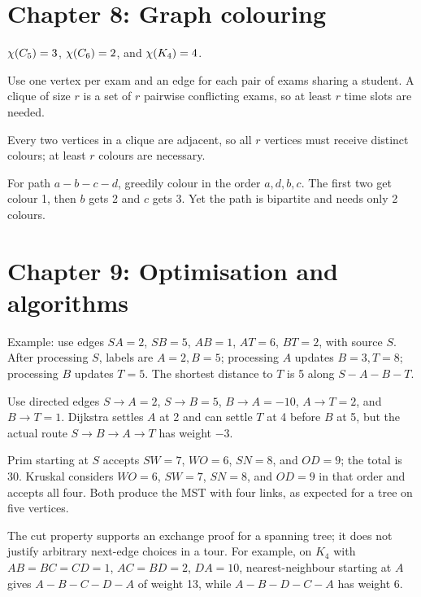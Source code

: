 \section*{Chapter 8: Graph colouring}
\begin{description}[style=nextline]
\item[8.1] $\chi(C_5)=3$, $\chi(C_6)=2$, and $\chi(K_4)=4$.
\item[8.2] Use one vertex per exam and an edge for each pair of exams sharing a student. A clique of size $r$ is a set of $r$ pairwise conflicting exams, so at least $r$ time slots are needed.
\item[8.3] Every two vertices in a clique are adjacent, so all $r$ vertices must receive distinct colours; at least $r$ colours are necessary.
\item[8.4] For path $a-b-c-d$, greedily colour in the order $a,d,b,c$. The first two get colour 1, then $b$ gets 2 and $c$ gets 3. Yet the path is bipartite and needs only 2 colours.
\end{description}

\section*{Chapter 9: Optimisation and algorithms}
\begin{description}[style=nextline]
\item[9.1] Example: use edges $SA=2$, $SB=5$, $AB=1$, $AT=6$, $BT=2$, with source $S$. After processing $S$, labels are $A=2,B=5$; processing $A$ updates $B=3,T=8$; processing $B$ updates $T=5$. The shortest distance to $T$ is 5 along $S-A-B-T$.
\item[9.2] Use directed edges $S\to A=2$, $S\to B=5$, $B\to A=-10$, $A\to T=2$, and $B\to T=1$. Dijkstra settles $A$ at 2 and can settle $T$ at 4 before $B$ at 5, but the actual route $S\to B\to A\to T$ has weight $-3$.
\item[9.3] Prim starting at $S$ accepts $SW=7$, $WO=6$, $SN=8$, and $OD=9$; the total is 30. Kruskal considers $WO=6$, $SW=7$, $SN=8$, and $OD=9$ in that order and accepts all four. Both produce the MST with four links, as expected for a tree on five vertices.
\item[9.4] The cut property supports an exchange proof for a spanning tree; it does not justify arbitrary next-edge choices in a tour. For example, on $K_4$ with $AB=BC=CD=1$, $AC=BD=2$, $DA=10$, nearest-neighbour starting at $A$ gives $A-B-C-D-A$ of weight 13, while $A-B-D-C-A$ has weight 6.
\end{description}

